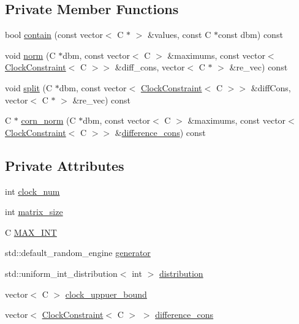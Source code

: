 \subsection*{Private Member Functions}
\begin{DoxyCompactItemize}
\item 
bool \mbox{\hyperlink{classgraphsat_1_1_d_b_m_factory_a9a6781c8ba87d7e1d3514a603a8600f4}{contain}} (const vector$<$ C $\ast$ $>$ \&values, const C $\ast$const dbm) const
\item 
void \mbox{\hyperlink{classgraphsat_1_1_d_b_m_factory_aba7883693f33b40f126bb406f6ead2c6}{norm}} (C $\ast$dbm, const vector$<$ C $>$ \&maximums, const vector$<$ \mbox{\hyperlink{classgraphsat_1_1_clock_constraint}{Clock\+Constraint}}$<$ C $>$$>$ \&diff\+\_\+cons, vector$<$ C $\ast$ $>$ \&re\+\_\+vec) const
\item 
void \mbox{\hyperlink{classgraphsat_1_1_d_b_m_factory_a8bcb9646051ac1004cccf3c6c845b20d}{split}} (C $\ast$dbm, const vector$<$ \mbox{\hyperlink{classgraphsat_1_1_clock_constraint}{Clock\+Constraint}}$<$ C $>$$>$ \&diff\+Cons, vector$<$ C $\ast$ $>$ \&re\+\_\+vec) const
\item 
C $\ast$ \mbox{\hyperlink{classgraphsat_1_1_d_b_m_factory_a24fb30c6cf4305ed996f4ca29a5adb65}{corn\+\_\+norm}} (C $\ast$dbm, const vector$<$ C $>$ \&maximums, const vector$<$ \mbox{\hyperlink{classgraphsat_1_1_clock_constraint}{Clock\+Constraint}}$<$ C $>$$>$ \&\mbox{\hyperlink{classgraphsat_1_1_d_b_m_factory_a82c522596ca856797626cfa989863b3c}{difference\+\_\+cons}}) const
\end{DoxyCompactItemize}
\subsection*{Private Attributes}
\begin{DoxyCompactItemize}
\item 
int \mbox{\hyperlink{classgraphsat_1_1_d_b_m_factory_ac5495ee1709f1c30767cf9cb7b33fa45}{clock\+\_\+num}}
\item 
int \mbox{\hyperlink{classgraphsat_1_1_d_b_m_factory_a87e76925a7014706de170916fa25ad6e}{matrix\+\_\+size}}
\item 
C \mbox{\hyperlink{classgraphsat_1_1_d_b_m_factory_ab31453fbd3195ee7bbe6e1571af9e420}{M\+A\+X\+\_\+\+I\+NT}}
\item 
std\+::default\+\_\+random\+\_\+engine \mbox{\hyperlink{classgraphsat_1_1_d_b_m_factory_ad072fe9626380dbb008aed5b14d392f2}{generator}}
\item 
std\+::uniform\+\_\+int\+\_\+distribution$<$ int $>$ \mbox{\hyperlink{classgraphsat_1_1_d_b_m_factory_a71f57dc6a5e77ae6d8814e4bce286670}{distribution}}
\item 
vector$<$ C $>$ \mbox{\hyperlink{classgraphsat_1_1_d_b_m_factory_af348f08d8be1bc46a4cd6b89d63b19a6}{clock\+\_\+uppuer\+\_\+bound}}
\item 
vector$<$ \mbox{\hyperlink{classgraphsat_1_1_clock_constraint}{Clock\+Constraint}}$<$ C $>$ $>$ \mbox{\hyperlink{classgraphsat_1_1_d_b_m_factory_a82c522596ca856797626cfa989863b3c}{difference\+\_\+cons}}
\end{DoxyCompactItemize}



